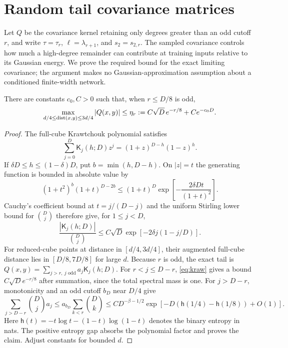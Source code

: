 \section{Random tail covariance matrices}\label{app:gram}
Let $Q$ be the covariance kernel retaining only degrees greater than an
odd cutoff $r$, and write $\tau=\tau_r$, $\ell=\lambda_{r+1}$, and
$s_2=s_{2,r}$. The sampled covariance controls how much a high-degree
remainder can contribute at training inputs relative to its Gaussian
energy. We prove the required bound for the exact limiting covariance;
the argument makes no Gaussian-approximation assumption about a
conditioned finite-width network.

\begin{lemma}\label{lem:far}
There are constants $c_0,C>0$ such that, when $r\le D/8$ is odd,
\[
 \max_{d/4\le\operatorname{dist}(x,y)\le3d/4}|Q(x,y)|
 \le\eta_r:=C\sqrt D\,e^{-r/8}+Ce^{-c_0D}.
\]
\end{lemma}
\begin{proof}
The full-cube Krawtchouk polynomial satisfies
\[
 \sum_{j=0}^D\mathsf K_j(h;D)z^j=(1+z)^{D-h}(1-z)^h.
\]
If $\delta D\le h\le(1-\delta)D$, put $b=\min(h,D-h)$.
On $|z|=t$ the generating function is bounded in absolute value by
\[
 (1+t^2)^b(1+t)^{D-2b}
 \le(1+t)^D\exp\!\left[-\frac{2\delta Dt}{(1+t)^2}\right].
\]
Cauchy's coefficient bound at $t=j/(D-j)$ and the uniform Stirling
lower bound for $\binom Dj$ therefore give, for $1\le j<D$,
\begin{equation}\label{eq:kraw}
 \frac{|\mathsf K_j(h;D)|}{\binom Dj}
 \le C\sqrt D\exp[-2\delta j(1-j/D)].
\end{equation}
For reduced-cube points at distance in $[d/4,3d/4]$, their augmented
full-cube distance lies in $[D/8,7D/8]$ for large $d$.
Because $r$ is odd, the exact tail is
$Q(x,y)=\sum_{j>r,\ j\text{ odd}}a_j\mathsf K_j(h;D)$.
For $r<j\le D-r$, \eqref{eq:kraw} gives a bound
$C\sqrt D e^{-r/8}$ after summation, since the total spectral mass
is one. For $j>D-r$, monotonicity and an odd cutoff $b_D$ near $D/4$
give
\[
 \sum_{j>D-r}\binom Dj a_j
 \le a_{b_D}\sum_{k<r}\binom Dk
 \le C D^{-\beta-1/2}
       \exp[-D(\mathsf h(1/4)-\mathsf h(1/8))+O(1)].
\]
Here $\mathsf h(t)=-t\log t-(1-t)\log(1-t)$ denotes the binary entropy in nats.
The positive entropy gap absorbs the polynomial factor and proves the
claim. Adjust constants for bounded $d$.
\end{proof}

